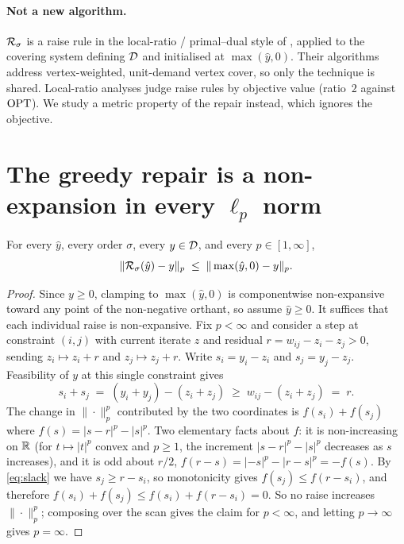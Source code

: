 \paragraph{Not a new algorithm.} $\mathcal{R}_\sigma$ is a raise rule in the local-ratio /
primal--dual style of \citet{baryehuda1981,baryehuda1985}, applied to the
covering system defining $\mathcal{D}$ and initialised at $\max(\hat{y},0)$. Their algorithms address
vertex-weighted, unit-demand vertex cover, so only the technique is shared.
Local-ratio analyses judge raise rules by objective value (ratio~$2$ against $\mathrm{OPT}$). We study a
metric property of the repair instead, which ignores the objective.

\section{The greedy repair is a non-expansion in every \texorpdfstring{$\ell_p$}{Lp} norm}\label{sec:nonexp}

\begin{theorem}\label{thm:nonexp}
For every $\hat{y}$, every order $\sigma$, every $y \in \mathcal{D}$, and every $p \in [1,\infty]$,
\[
\|\mathcal{R}_\sigma(\hat{y}) - y\|_p \;\le\; \|\max(\hat{y},0) - y\|_p .
\]
\end{theorem}

\begin{proof}
Since $y \ge 0$, clamping to $\max(\hat{y},0)$ is componentwise non-expansive toward any point of
the non-negative orthant, so assume $\hat{y} \ge 0$. It suffices that each individual raise is
non-expansive.
Fix $p < \infty$ and consider a step at constraint $(i,j)$ with current iterate $z$ and residual
$r = w_{ij} - z_i - z_j > 0$, sending $z_i \mapsto z_i + r$ and $z_j \mapsto z_j + r$. Write
$s_i = y_i - z_i$ and $s_j = y_j - z_j$. Feasibility of $y$ at this single constraint gives
\begin{equation}\label{eq:slack}
s_i + s_j \;=\; (y_i + y_j) - (z_i + z_j) \;\ge\; w_{ij} - (z_i + z_j) \;=\; r .
\end{equation}
The change in $\|\cdot\|_p^p$ contributed by the two coordinates is $f(s_i) + f(s_j)$ where
$f(s) = |s - r|^p - |s|^p$. Two elementary facts about $f$: it is non-increasing on $\mathbb{R}$ (for
$t \mapsto |t|^p$ convex and $p \ge 1$, the increment $|s-r|^p - |s|^p$ decreases as $s$
increases), and it is odd about $r/2$, $f(r - s) = |{-s}|^p - |r - s|^p = -f(s)$.
By \eqref{eq:slack} we have $s_j \ge r - s_i$, so monotonicity gives $f(s_j) \le f(r - s_i)$, and
therefore $f(s_i) + f(s_j) \le f(s_i) + f(r - s_i) = 0$.
So no raise increases $\|\cdot\|_p^p$; composing over the scan gives the claim for $p < \infty$, and
letting $p \to \infty$ gives $p = \infty$.
\end{proof}

